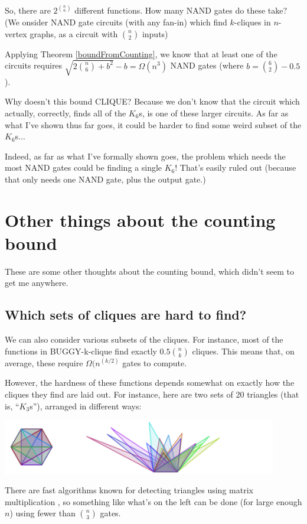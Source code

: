\documentclass[12pt]{article}
\theoremstyle{definition}
\begin{document}
So, there are $2^{n \choose 6}$ different functions. 
How many NAND gates do these take?
(We onsider NAND gate circuits (with any fan-in) which find $k$-cliques in $n$-vertex
graphs, as a circuit with $n \choose 2$ inputs)

Applying Theorem
\ref{boundFromCounting}, we know that at least one of the circuits requires
${\sqrt {2 {n \choose 6} + b^2}} - b = \Omega(n^3)$ 
NAND gates (where $b = {6 \choose 2} - 0.5$).

Why doesn't this bound CLIQUE?
Because we don't know that the circuit which actually,
correctly, finds all of the
$K_6$s, is one of these larger circuits. As far as what I've
shown thus far goes, it could be harder to find some weird subset of the $K_6$s...

Indeed, as far as what I've formally shown goes, the problem which needs
the most NAND gates could be finding a single $K_6$! That's easily ruled out
(because that only needs one NAND gate, plus the output gate.)

\section{Other things about the counting bound}

These are some other thoughts about the counting bound, which didn't
seem to get me anywhere.

\subsection{Which sets of cliques are hard to find?}

We can also consider various subsets of the cliques. For instance,
most of the functions in BUGGY-k-clique find exactly
$0.5 {n \choose k }$ cliques. This means that, on average, these
require $\Omega(n ^ (k/2)$ gates to compute.

However, the hardness of these functions depends somewhat
on exactly how the cliques they find are laid out.
For instance, here are two sets of 20 triangles (that is, ``$K_3$s''),
arranged in different ways:

\includegraphics[width=0.9\textwidth]{R/tri1.pdf}

There are fast algorithms known for
detecting triangles using matrix multiplication
 \cite{itai_finding_1977} \cite{williams_multiplying_2012}, so
something like what's on the left can be done (for large enough
$n$) using fewer than ${n \choose 3}$ gates.
\end{document}
